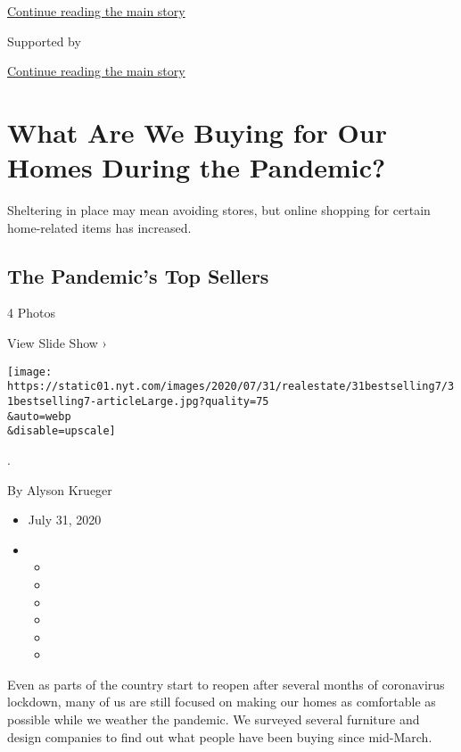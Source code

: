 \protect\hyperlink{after-top}{Continue reading the main story}

Supported by

\protect\hyperlink{after-sponsor}{Continue reading the main story}

\hypertarget{what-are-we-buying-for-our-homes-during-the-pandemic}{%
\section{What Are We Buying for Our Homes During the
Pandemic?}\label{what-are-we-buying-for-our-homes-during-the-pandemic}}

Sheltering in place may mean avoiding stores, but online shopping for
certain home-related items has increased.

\href{https://www.nytimes.com/slideshow/2020/07/31/realestate/the-pandemics-top-sellers.html}{}

\hypertarget{the-pandemics-top-sellers}{%
\subsection{The Pandemic's Top
Sellers}\label{the-pandemics-top-sellers}}

4 Photos

View Slide Show ›

\texttt{[image: https://static01.nyt.com/images/2020/07/31/realestate/31bestselling7/31bestselling7-articleLarge.jpg?quality=75\\\&auto=webp\\\&disable=upscale]}

.

By Alyson Krueger

\begin{itemize}
\item
  July 31, 2020
\item
  \begin{itemize}
  \item
  \item
  \item
  \item
  \item
  \item
  \end{itemize}
\end{itemize}

Even as parts of the country start to reopen after several months of
coronavirus lockdown, many of us are still focused on making our homes
as comfortable as possible while we weather the pandemic. We surveyed
several furniture and design companies to find out what people have been
buying since mid-March.


